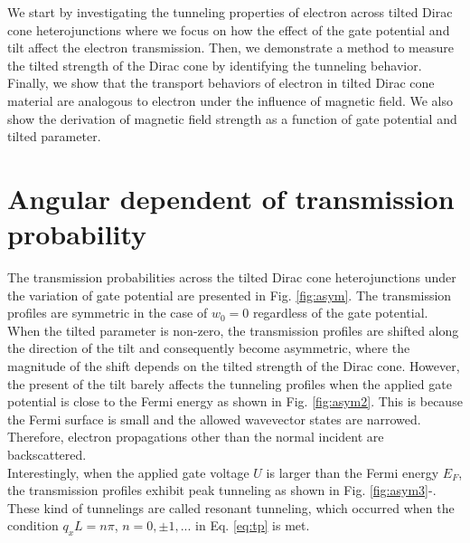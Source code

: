 We start by investigating the tunneling properties of electron across tilted Dirac cone heterojunctions where we focus on how
the effect of the gate potential and tilt affect the electron transmission.  
Then, we demonstrate a method to measure the tilted strength of the Dirac cone by identifying the tunneling behavior.
Finally, we show that the transport behaviors of electron in tilted Dirac cone material are analogous to electron under
the influence of magnetic field. We also show the derivation of magnetic field strength as a function of gate potential and tilted parameter.


\section{Angular dependent of transmission probability} \label{sec:asym}
    The transmission probabilities across the tilted Dirac cone heterojunctions under the variation of gate potential are presented in Fig. \ref{fig:asym}.
    The transmission profiles are symmetric in the case of $w_0 = 0$ regardless of the gate potential. 
    When the tilted parameter is non-zero, the transmission profiles are shifted along the direction of the tilt and consequently become asymmetric, where the magnitude of the shift depends on the tilted strength of the Dirac cone.
    However, the present of the tilt barely affects the tunneling profiles when the applied gate potential is close to the Fermi energy as shown in Fig. \ref{fig:asym2}.
    This is because the Fermi surface is small and the allowed wavevector states are narrowed. Therefore, electron propagations other than the normal incident are backscattered.\\
    
    Interestingly, when the applied gate voltage $U$ is larger than the Fermi energy $E_F$, the transmission profiles exhibit peak tunneling as shown in Fig. \ref{fig:asym3}-.
    These kind of tunnelings are called resonant tunneling, which occurred when the condition $q_x L = n \pi$, $n = 0, \pm1,...$ in Eq. \ref{eq:tp} is met.
    
